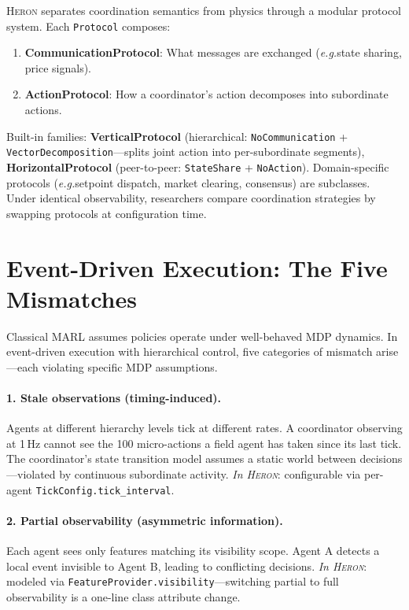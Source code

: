 \documentclass{article}
\newcommand{\heron}{\textsc{Heron}}
\newcommand{\eg}{\textit{e.g.}}
\begin{document}
\heron{} separates coordination semantics from physics through a modular protocol system. Each \texttt{Protocol} composes:
\begin{enumerate}[nosep]
    \item \textbf{CommunicationProtocol}: What messages are exchanged (\eg state sharing, price signals).
    \item \textbf{ActionProtocol}: How a coordinator's action decomposes into subordinate actions.
\end{enumerate}

Built-in families: \textbf{VerticalProtocol} (hierarchical: \texttt{NoCommunication} + \texttt{VectorDecomposition}---splits joint action into per-subordinate segments), \textbf{HorizontalProtocol} (peer-to-peer: \texttt{StateShare} + \texttt{NoAction}). Domain-specific protocols (\eg setpoint dispatch, market clearing, consensus) are subclasses. Under identical observability, researchers compare coordination strategies by swapping protocols at configuration time.

\section{Event-Driven Execution: The Five Mismatches}
\label{sec:mismatches}

Classical MARL assumes policies operate under well-behaved MDP dynamics. In event-driven execution with hierarchical control, five categories of mismatch arise---each violating specific MDP assumptions.

\paragraph{1. Stale observations (timing-induced).}
Agents at different hierarchy levels tick at different rates. A coordinator observing at 1\,Hz cannot see the 100 micro-actions a field agent has taken since its last tick. The coordinator's state transition model assumes a static world between decisions---violated by continuous subordinate activity. \emph{In \heron{}}: configurable via per-agent \texttt{TickConfig.tick\_interval}.

\paragraph{2. Partial observability (asymmetric information).}
Each agent sees only features matching its visibility scope. Agent A detects a local event invisible to Agent B, leading to conflicting decisions. \emph{In \heron{}}: modeled via \texttt{FeatureProvider.visibility}---switching partial to full observability is a one-line class attribute change.
\end{document}
